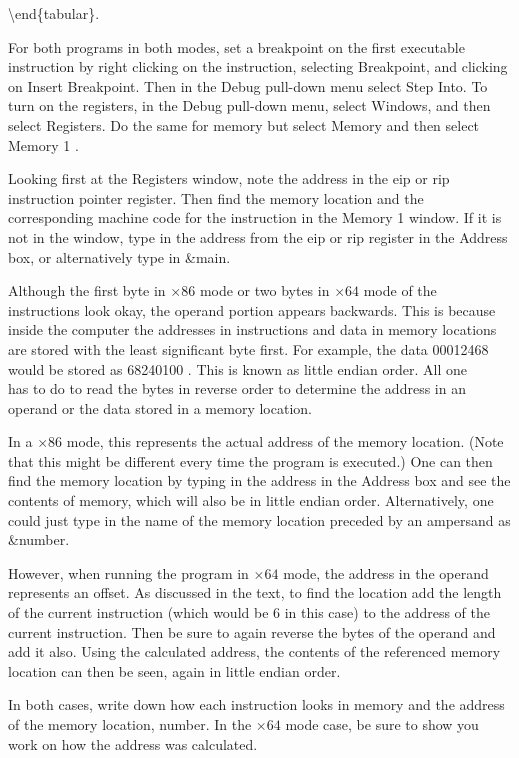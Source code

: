 \documentclass[10pt]{book}
\begin{document}
\textbackslash end\{tabular\}.

For both programs in both modes, set a breakpoint on the first executable instruction by right clicking on the instruction, selecting Breakpoint, and clicking on Insert Breakpoint. Then in the Debug pull-down menu select Step Into. To turn on the registers, in the Debug pull-down menu, select Windows, and then select Registers. Do the same for memory but select Memory and then select Memory 1 .

Looking first at the Registers window, note the address in the eip or rip instruction pointer register. Then find the memory location and the corresponding machine code for the instruction in the Memory 1 window. If it is not in the window, type in the address from the eip or rip register in the Address box, or alternatively type in \&main.

Although the first byte in $\times 86$ mode or two bytes in $\times 64$ mode of the instructions look okay, the operand portion appears backwards. This is because inside the computer the addresses in instructions and data in memory locations are stored with the least significant byte first. For example, the data 00012468 would be stored as 68240100 . This is known as little endian order. All one\\
has to do to read the bytes in reverse order to determine the address in an operand or the data stored in a memory location.


In a $\times 86$ mode, this represents the actual address of the memory location. (Note that this might be different every time the program is executed.) One can then find the memory location by typing in the address in the Address box and see the contents of memory, which will also be in little endian order. Alternatively, one could just type in the name of the memory location preceded by an ampersand as \&number.

However, when running the program in $\times 64$ mode, the address in the operand represents an offset. As discussed in the text, to find the location add the length of the current instruction (which would be 6 in this case) to the address of the current instruction. Then be sure to again reverse the bytes of the operand and add it also. Using the calculated address, the contents of the referenced memory location can then be seen, again in little endian order.

In both cases, write down how each instruction looks in memory and the address of the memory location, number. In the $\times 64$ mode case, be sure to show you work on how the address was calculated.
\end{document}
